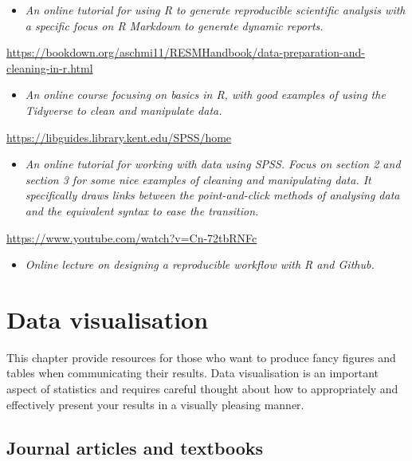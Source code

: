 \documentclass[
]{book}
\providecommand{\tightlist}{%
  \setlength{\itemsep}{0pt}\setlength{\parskip}{0pt}}
\begin{document}
\begin{itemize}
\tightlist
\item
  \emph{An online tutorial for using R to generate reproducible scientific analysis with a specific focus on R Markdown to generate dynamic reports.}
\end{itemize}

\url{https://bookdown.org/aschmi11/RESMHandbook/data-preparation-and-cleaning-in-r.html}

\begin{itemize}
\tightlist
\item
  \emph{An online course focusing on basics in R, with good examples of using the Tidyverse to clean and manipulate data.}
\end{itemize}

\url{https://libguides.library.kent.edu/SPSS/home}

\begin{itemize}
\tightlist
\item
  \emph{An online tutorial for working with data using SPSS. Focus on section 2 and section 3 for some nice examples of cleaning and manipulating data. It specifically draws links between the point-and-click methods of analysing data and the equivalent syntax to ease the transition.}
\end{itemize}

\url{https://www.youtube.com/watch?v=Cn-72tbRNFc}

\begin{itemize}
\tightlist
\item
  \emph{Online lecture on designing a reproducible workflow with R and Github.}
\end{itemize}

\chapter{Data visualisation}\label{data-visualisation}

This chapter provide resources for those who want to produce fancy figures and tables when communicating their results. Data visualisation is an important aspect of statistics and requires careful thought about how to appropriately and effectively present your results in a visually pleasing manner.

\section{Journal articles and textbooks}\label{journal-articles-and-textbooks-1}
\end{document}
